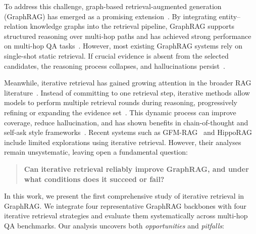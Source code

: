 \documentclass{article} %
\begin{document}
To address this challenge, graph-based retrieval-augmented generation (GraphRAG) has emerged as a promising extension~\citep{edge2024local,han2024retrieval,he2024g,wu2025medical,jiang2024ragraph}. By integrating entity–relation knowledge graphs into the retrieval pipeline, GraphRAG supports structured reasoning over multi-hop paths and has achieved strong performance on multi-hop QA tasks~\citep{zou2025weak,jimenez2024hipporag,gutierrez2025rag,mavromatis2025gnn}. However, most existing GraphRAG systems rely on single-shot static retrieval. If crucial evidence is absent from the selected candidates, the reasoning process collapses, and hallucinations persist~\citep{luo2025graph,guo2025empowering}.

Meanwhile, iterative retrieval has gained growing attention in the broader RAG literature~\citep{trivedi2022interleaving,jiang2025retrieve,lee2025rearag}. Instead of committing to one retrieval step, iterative methods allow models to perform multiple retrieval rounds during reasoning, progressively refining or expanding the evidence set~\citep{shao2023enhancing}. This dynamic process can improve coverage, reduce hallucination, and has shown benefits in chain-of-thought and self-ask style frameworks~\citep{trivedi2022interleaving}. 
Recent systems such as GFM-RAG~\citep{luo2025gfm} and HippoRAG~\citep{jimenez2024hipporag} include limited explorations using iterative retrieval. 
However, their analyses remain unsystematic, leaving open a fundamental question:

\begin{quote}
\textbf{Can iterative retrieval reliably improve GraphRAG, and under what conditions does it succeed or fail?} 
\end{quote}

In this work, we present the first comprehensive study of iterative retrieval in GraphRAG. 
We integrate four representative GraphRAG backbones with four iterative retrieval strategies and evaluate them systematically across multi-hop QA benchmarks. 
Our analysis uncovers both \emph{opportunities} and \emph{pitfalls}:
\end{document}
